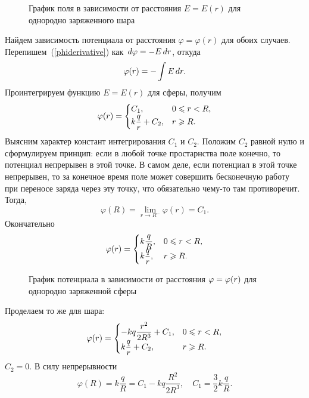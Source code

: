 	\begin{figure}[t]
		\centering
		
		\caption{График поля в зависимости от расстояния $E=E(r)$ для однородно заряженного шара}
	\end{figure}
	Найдем зависимость потенциала от расстояния $\varphi=\varphi(r)$ для обоих случаев. Перепишем~(\ref{phiderivative}) как $\,d \varphi=-E\,d r$, откуда
	\begin{equation}
		\varphi(r)=-\int E\,d r.
	\end{equation}
	Проинтегрируем функцию $E=E(r)$ для сферы, получим
	\begin{equation}
		\varphi(r)=\begin{cases}
						C_1,& \text{$0\leqslant r<R$},\\
						k\dfrac{q}{r} + C_2,& \text{$r\geqslant R$}.
					\end{cases}
	\end{equation}
	Выясним характер констант интегрирования $C_1$ и $C_2$. Положим $C_2$ равной нулю и сформулируем принцип: если в любой точке простарнства поле конечно, то потенциал непрерывен в этой точке. В самом деле, если потенциал в этой точке непрерывен, то за конечное время поле может совершить бесконечную работу при переносе заряда через эту точку, что обязательно чему-то там противоречит. Тогда,
		$$\varphi(R)=\lim_{r\rightarrow R^-} \varphi(r)=C_1.$$
	Окончательно
	\begin{equation}
		\varphi(r)=\begin{cases}
						k\dfrac{q}{R},& \text{$0\leqslant r<R$},\\
						k\dfrac{q}{r},& \text{$r\geqslant R$}.
					\end{cases}
	\end{equation}
	\begin{figure}[t]
		\centering
		
		\caption{График потенциала в зависимости от расстояния $\varphi\hm{=}\varphi(r)$ для однородно заряженной сферы}
	\end{figure}
	Проделаем то же для шара:
	\begin{equation}
		\varphi(r)=\begin{cases}
						-kq\dfrac{r^2}{2R^3}+C_1,& \text{$0\leqslant r<R$},\\
						k\dfrac{q}{r} + C_2,& \text{$r\geqslant R$}.
					\end{cases}
	\end{equation}
	$C_2=0$. В силу непрерывности
		$$\varphi(R)=k\frac{q}{R}=C_1-kq\frac{R^2}{2R^3}, \quad C_1=\frac{3}{2}k\frac{q}{R}.$$
